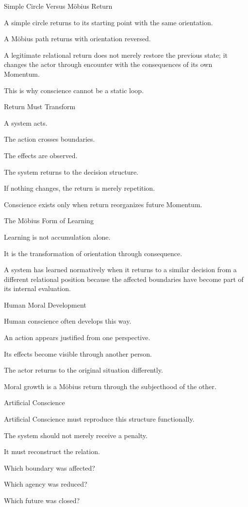 Simple Circle Versus Möbius Return

A simple circle returns to its starting point with the same orientation.

A Möbius path returns with orientation reversed.

A legitimate relational return does not merely restore the previous state; it changes the actor through encounter with the consequences of its own Momentum.

This is why conscience cannot be a static loop.

Return Must Transform

A system acts.

The action crosses boundaries.

The effects are observed.

The system returns to the decision structure.

If nothing changes, the return is merely repetition.

Conscience exists only when return reorganizes future Momentum.

The Möbius Form of Learning

Learning is not accumulation alone.

It is the transformation of orientation through consequence.

A system has learned normatively when it returns to a similar decision from a different relational position because the affected boundaries have become part of its internal evaluation.

Human Moral Development

Human conscience often develops this way.

An action appears justified from one perspective.

Its effects become visible through another person.

The actor returns to the original situation differently.

Moral growth is a Möbius return through the subjecthood of the other.

Artificial Conscience

Artificial Conscience must reproduce this structure functionally.

The system should not merely receive a penalty.

It must reconstruct the relation.

Which boundary was affected?

Which agency was reduced?

Which future was closed?

